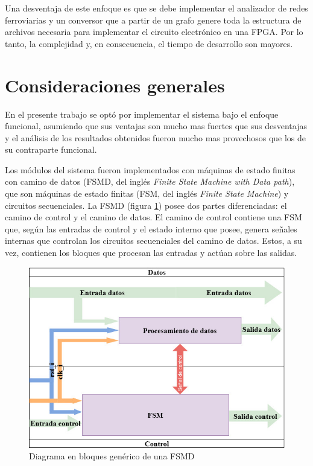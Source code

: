 			Una desventaja de este enfoque es que se debe implementar el analizador de redes ferroviarias y un conversor que a partir de un grafo genere toda la estructura de archivos necesaria para implementar el circuito electrónico en una FPGA. Por lo tanto, la complejidad y, en consecuencia, el tiempo de desarrollo son mayores.
			
\section{Consideraciones generales}

En el presente trabajo se optó por implementar el sistema bajo el enfoque funcional, asumiendo que sus ventajas son mucho mas fuertes que sus desventajas y el análisis de los resultados obtenidos fueron mucho mas provechosos que los de su contraparte funcional.

Los módulos del sistema fueron implementados con máquinas de estado finitas con camino de datos (FSMD, del inglés \textit{Finite State Machine with Data path}), que son máquinas de estado finitas (FSM, del inglés \textit{Finite State Machine}) y circuitos secuenciales. La FSMD (figura \ref{fig:FSMD}) posee dos partes diferenciadas: el camino de control y el camino de datos. El camino de control contiene una FSM que, según las entradas de control y el estado interno que posee, genera señales internas que controlan los circuitos secuenciales del camino de datos. Estos, a su vez, contienen los bloques que procesan las entradas y actúan sobre las salidas.

	\begin{figure}[h]
	\centering
		\includegraphics[scale=.55]{./Figures/FSMD}
		\caption{Diagrama en bloques genérico de una FSMD}
		\label{fig:FSMD}
	\end{figure}
	
